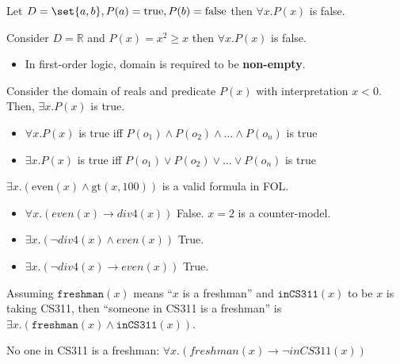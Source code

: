 \documentclass[8pt]{scrreprt}
\newcommand{\true}{\text{true}}
\newcommand{\false}{\text{false}}
\begin{document}
\begin{landscape}
\begin{multicols*}{3}
\begin{example}
	Let $D=\set{a,b}, P(a)=\true,P(b)=\false$ then $\forall x.P(x)$ is false.
\end{example}

\begin{example}
	Consider $D=\mathbb{R}$ and $P(x)=x^2\geq x$ then $\forall x.P(x)$ is false.
\end{example}

\begin{itemize}
	\item In first-order logic, domain is required to be \textbf{non-empty}.
\end{itemize}

\begin{example}
	Consider the domain of reals and predicate $P(x)$ with interpretation $x<0$.
	Then, $\exists x.P(x)$ is true.

\end{example}

\begin{itemize}
	\item $\forall x.P(x)$ is true iff $P(o_1) \land P(o_2) \land \ldots \land P(o_n)$ is true
	\item $\exists x.P(x)$ is true iff $P(o_1) \lor P(o_2) \lor \ldots \lor P(o_n)$ is true
\end{itemize}

$\exists x.(\text{even}(x)\land \text{gt}(x, 100))$ is a valid formula in FOL.

\begin{example}
	\begin{itemize}
		\item $\forall x.(even(x)\rightarrow div4(x))$ False. $x=2$ is a counter-model.
		\item $\exists x.(\neg div4(x)\land even(x))$ True.
		\item $\exists x. (\neg div4(x)\rightarrow even(x))$ True.
	\end{itemize}
\end{example}

\begin{example}
	Assuming $\texttt{freshman}(x)$ means ``$x$ is a freshman'' and $\texttt{inCS311}(x)$
	to be $x$ is taking CS311, then ``someone in CS311 is a freshman'' is
	$\exists x.(\texttt{freshman}(x)\land \texttt{inCS311}(x))$.

	No one in CS311 is a freshman: $\forall x.(freshman(x)\rightarrow \neg inCS311(x))$


\end{example}
\end{multicols*}
\end{landscape}
\end{document}
